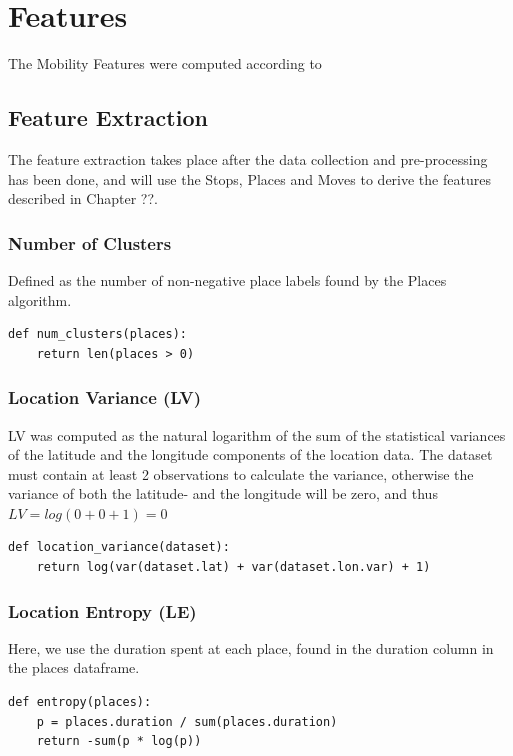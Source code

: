 \section{Features}
The Mobility Features were computed according to 

\subsection{Feature Extraction}
The feature extraction takes place after the data collection and pre-processing has been done, and will use the Stops, Places and Moves to derive the features described in Chapter ??. 

\subsubsection{Number of Clusters}
Defined as the number of non-negative place labels found by the Places algorithm.

\begin{verbatim}
def num_clusters(places):
    return len(places > 0)
\end{verbatim}

\subsubsection{Location Variance (LV)} 
LV was computed as the natural logarithm of the sum of the statistical variances of the latitude and the longitude components of the location data. The dataset must contain at least 2 observations to calculate the variance, otherwise the variance of both the latitude- and the longitude will be zero, and thus $LV = log(0 + 0 + 1)  = 0$

\begin{verbatim}
def location_variance(dataset):
    return log(var(dataset.lat) + var(dataset.lon.var) + 1)
\end{verbatim}

\subsubsection{Location Entropy (LE)} 
Here, we use the duration spent at each place, found in the duration column in the places dataframe.

\begin{verbatim}
def entropy(places):
    p = places.duration / sum(places.duration)
    return -sum(p * log(p))
\end{verbatim}

